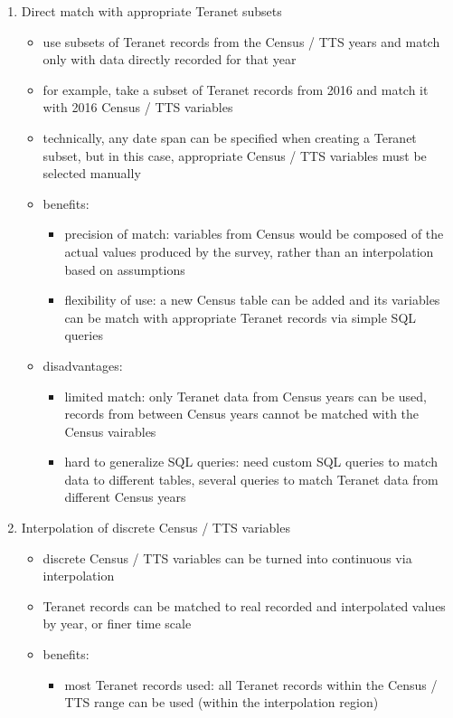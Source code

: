 \begin{enumerate}
    \item Direct match with appropriate Teranet subsets
    \begin{itemize}
        \item use subsets of Teranet records from the Census / TTS years and match only with data directly recorded for that year
        \item for example, take a subset of Teranet records from 2016 and match it with 2016 Census / TTS variables
        \item technically, any date span can be specified when creating a Teranet subset, but in this case, appropriate Census / TTS variables must be selected manually
        \item benefits:
        \begin{itemize}
            \item precision of match: variables from Census would be composed of the actual values produced by the survey, rather than an interpolation based on assumptions
            \item flexibility of use: a new Census table can be added and its variables can be match with appropriate Teranet records via simple SQL queries
        \end{itemize}
        \item disadvantages:
        \begin{itemize}
            \item limited match: only Teranet data from Census years can be used, records from between Census years cannot be matched with the Census vairables
            \item hard to generalize SQL queries: need custom SQL queries to match data to different tables, several queries to match Teranet data from different Census years
        \end{itemize}
    \end{itemize}
    \item Interpolation of discrete Census / TTS variables
    \begin{itemize}
        \item discrete Census / TTS variables can be turned into continuous via interpolation
        \item Teranet records can be matched to real recorded and interpolated values by year, or finer time scale
        \item benefits:
        \begin{itemize}
            \item most Teranet records used: all Teranet records within the Census / TTS range can be used (within the interpolation region)

\end{itemize}
\end{itemize}
\end{enumerate}
